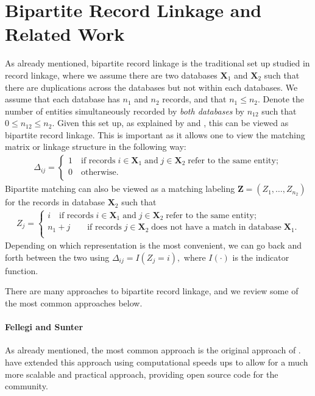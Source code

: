 \documentclass[12pt,letterpaper]{article}
\newcommand{\1}[1]{\mathbb{I}\!\left[#1\right]} %
\begin{document}
\section{Bipartite Record Linkage and Related Work}
As already mentioned, bipartite record linkage is the traditional set up studied in record linkage, where we assume there are two databases $\bm{X}_1$ and $\bm{X}_2$ such that there are duplications across the databases but not within each databases. We assume that each database has $n_1$ and $n_2$ records, and that $n_1 \leq n_2.$ Denote the number of entities simultaneously recorded by \emph{both databases} by $n_{12}$ such that $0 \leq n_{12} \leq n_2.$ Given this set up, as explained by \cite{steorts_bayesian_2016} and \cite{sadinle_bayesian_2017}, this can be viewed as bipartite record linkage. This is important as it allows one to view the matching matrix or linkage structure in the following way:
\begin{align}
\Delta_{ij} =
\begin{cases}
1 \quad \text{if records}\;  i \in \bm{X}_1 \; \text{and}\; j\in \bm{X}_2 \; \text{refer to the same entity}; \\
0 \quad \text{otherwise}.\\
\end{cases}
\end{align}
Bipartite matching can also be viewed as a matching labeling $\bm{Z} = (Z_1, \ldots, Z_{n_2})$ for the records in database $\bm{X}_2$ such that 
\begin{align}
Z_{j} =
\begin{cases}
i \quad \text{if records}\;  i \in \bm{X}_1 \; \text{and}\; j\in \bm{X}_2 \; \text{refer to the same entity}; \\
n_1 + j \quad  \quad \text{if records}\;  j \in \bm{X}_2 \; \text{does not have a match in database}\; \bm{X}_1. \\
\end{cases}
\end{align}
Depending on which representation is the most convenient, we can go back and forth between the two using $\Delta_{ij} = I(Z_j = i),$ where $I(\cdot)$ is the indicator function. 

There are many approaches to bipartite record linkage, and we review some of the most common approaches below.

\paragraph{Fellegi and Sunter}
As already mentioned, the most common approach is the original approach of \cite{fellegi_theory_1969}. \cite{enamorado2019using} have extended this approach using computational speeds ups to allow for a much more scalable and practical approach, providing open source code for the community. 
\end{document}
